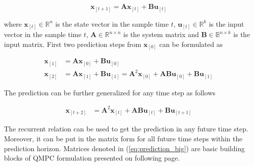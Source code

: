 \begin{equation}
\textbf{x}_{[t+1]} = \textbf{A}\textbf{x}_{[t]} + \textbf{B}\textbf{u}_{[t]}
\label{eq:mpc_lti_system}
\end{equation}

where $\textbf{x}_{[t]} \in \mathbb{R}^{n}$ is the state vector in the sample time $t$, $\textbf{u}_{[t]} \in \mathbb{R}^k$ is the input vector in the sample time $t$, $\textbf{A} \in \mathbb{R}^{n\times n}$ is the system matrix and $\textbf{B} \in \mathbb{B}^{n\times k}$ is the input matrix. First two prediction steps from $\textbf{x}_{[0]}$ can be formulated as

\begin{equation}
\begin{split}
\textbf{x}_{[1]} &= \textbf{A}\textbf{x}_{[0]} + \textbf{B}\textbf{u}_{[0]} \\
\textbf{x}_{[2]} &= \textbf{A}\textbf{x}_{[1]} + \textbf{B}\textbf{u}_{[1]} = \textbf{A}^2\textbf{x}_{[0]} + \textbf{A}\textbf{B}\textbf{u}_{[0]} + \textbf{B}\textbf{u}_{[1]}
\end{split}
\end{equation}

The prediction can be further generalized for any time step as follows

\begin{equation}
\begin{split}
\textbf{x}_{[t+2]} &= \textbf{A}^2\textbf{x}_{[t]} + \textbf{A}\textbf{B}\textbf{u}_{[t]} + \textbf{B}\textbf{u}_{[t+1]}
\end{split}
\end{equation}

The recurrent relation can be used to get the prediction in any future time step.  Moreover, it can be put in the matrix form for all future time steps within the prediction horizon. Matrices denoted in (\ref{eq:prediction_big}) are basic building blocks of QMPC formulation presented on following page.

